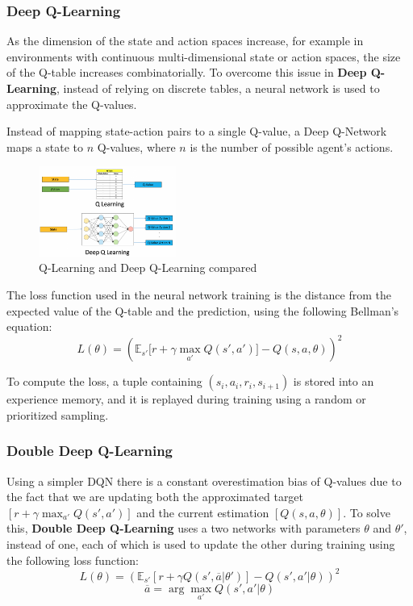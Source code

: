 \documentclass[13pt]{article}
\begin{document}
\subsubsection{Deep Q-Learning}
As the dimension of the state and action spaces increase, for example in environments with continuous multi-dimensional state or action spaces, 
the size of the Q-table increases combinatorially. To overcome this issue in \textbf{Deep Q-Learning}\cite{mnih2013playing}, instead of relying on discrete tables, a neural network is used to approximate the Q-values.

Instead of mapping state-action pairs to a single Q-value, a Deep Q-Network maps a state to $n$ Q-values, where $n$ is the number of possible agent's actions.

\begin{figure}[h]
    \centering
    \includegraphics[width=0.4\textwidth]{assets/Reinforcement Learning/q-vs-dqn.png}
    \caption{Q-Learning and Deep Q-Learning compared}
    \label{fig:q-vs-dqn}
\end{figure}

The loss function used in the neural network training is the distance from the expected value of the Q-table and the prediction, using the following Bellman's equation:
\[L(\theta) = (\mathbb{E}_{s'}[r + \gamma \max_{a'}{Q(s',a')]} - Q(s,a,\theta))^2 \]

To compute the loss, a tuple containing $(s_i, a_i, r_i, s_{i+1})$ is stored into an experience memory, and it is replayed during training using a random or prioritized sampling.

\subsubsection{Double Deep Q-Learning}
Using a simpler DQN there is a constant overestimation bias of Q-values due to the fact that we are updating both the approximated target $[r + \gamma \max_{a'}{Q(s',a')}]$ and the current estimation $[Q(s,a,\theta)]$. To solve this, \textbf{Double Deep Q-Learning}\cite{van2016deep} uses a two networks with parameters $\theta$ and $\theta'$, instead of one, each of which is used to update the other during training using the following loss function:
\[L(\theta) = (\mathbb{E}_{s'}[r + \gamma Q(s', \overline{a} | \theta')] - Q(s', a' |\theta))^2\]
\[\overline{a} = \arg\max_{a'}{Q(s',a' | \theta)}\]
\end{document}
